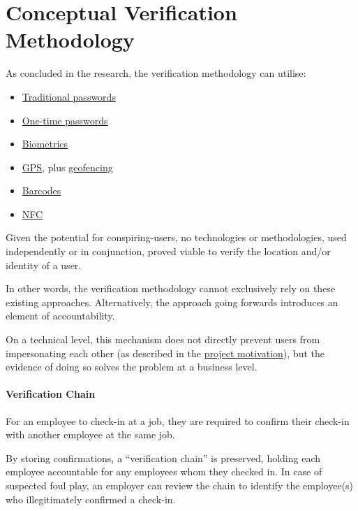 \section{Conceptual Verification Methodology}

As concluded in the research, the verification methodology
can utilise: 

\begin{itemize} 

  \item \hyperref[ss:passwords]{Traditional passwords}

  \item \hyperref[ss:otp]{One-time passwords}

  \item \hyperref[ss:biometrics]{Biometrics}

  \item \hyperref[ss:gps]{GPS}, plus
        \hyperref[ss:geofencing]{geofencing} 

  \item \hyperref[ss:barcodes]{Barcodes} 

  \item \hyperref[ss:nfc]{NFC} 

\end{itemize} 

Given the potential for \gls{conspiring-users}, no
technologies or methodologies, used independently or in
conjunction, proved viable to verify the location and/or
identity of a user.

In other words, the verification methodology cannot
exclusively rely on these existing approaches.
Alternatively, the approach going forwards introduces an
element of accountability.

On a technical level, this mechanism does not directly
prevent users from impersonating each other (as described
in the \hyperref[s:motivation]{project motivation}), but
the evidence of doing so solves the problem at a business
level.

\paragraph{Verification Chain}

For an employee to \gls{check-in} at a job, they are
required to confirm their check-in with another employee at
the same job.

By storing confirmations, a \enquote{verification chain} is
preserved, holding each employee accountable for any
employees whom they checked in.
In case of suspected foul play, an employer can review the
chain to identify the employee(s) who illegitimately
confirmed a check-in.

